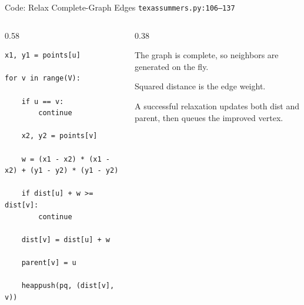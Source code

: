 \documentclass[aspectratio=169,11pt]{beamer}
\begin{document}
\begin{frame}[fragile]{Code: Relax Complete-Graph Edges}
\scriptsize
{} \texttt{texassummers.py:106--137}

\vspace{0.08cm}
\begin{columns}[T,totalwidth=\textwidth]
\begin{column}{0.58\textwidth}
\begin{lstlisting}[style=cpcode]
x1, y1 = points[u]

for v in range(V):

    if u == v:
        continue

    x2, y2 = points[v]

    w = (x1 - x2) * (x1 - x2) + (y1 - y2) * (y1 - y2)

    if dist[u] + w >= dist[v]:
        continue

    dist[v] = dist[u] + w

    parent[v] = u

    heappush(pq, (dist[v], v))
\end{lstlisting}
\end{column}
\begin{column}{0.38\textwidth}
\begin{tightitemize}
  \item The graph is complete, so neighbors are generated on the fly.
  \item Squared distance is the edge weight.
  \item A successful relaxation updates both dist and parent, then queues the improved vertex.
\end{tightitemize}
\end{column}
\end{columns}
\end{frame}
\end{document}
